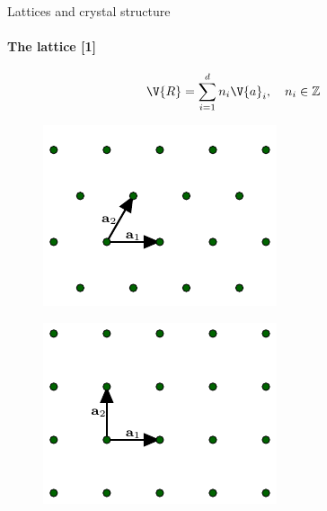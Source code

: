\documentclass{beamer}
\begin{document}
\begin{frame}{Lattices and crystal structure}
\framesubtitle{The lattice [1]}
\pause
\begin{equation*}
\V{R} = \sum_{i = 1}^{d} n_i \V{a}_i, \quad n_i \in \mathbb{Z}
\end{equation*}
\begin{figure}[H]
	\centering
	\begin{minipage}{.4\textwidth}
		\centering
		\includegraphics[width=\linewidth]{figures/triangular.pdf}
		\label{fig:triangular_lattice}
	\end{minipage}%
	\hfill
	\begin{minipage}{.4\textwidth}
		\centering
		\includegraphics[width=\linewidth]{figures/square.pdf}
		\label{fig:square_lattice}
	\end{minipage}
\end{figure}
\end{frame}
\end{document}

